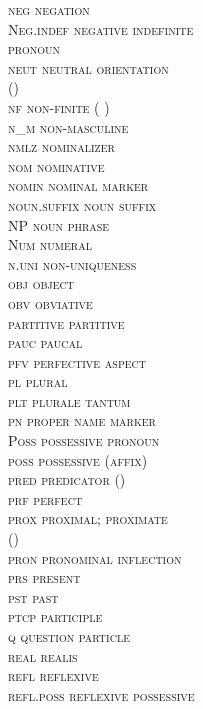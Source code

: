 \documentclass[output=collectionpaper]{langsci/langscibook}
\begin{document}
\begin{multicols}{2}
\begin{tabbing}
\scshape neg	\>	negation	\\
\normalfont Neg.indef	\>	negative indefinite\\ \> pronoun	\\
\scshape neut	\>	neutral orientation\\ \> () 	\\
\scshape nf	\>	non-finite ( )	\\
\scshape n\_m	\>	non-masculine	\\
\scshape nmlz	\>	nominalizer	\\
\scshape nom	\>	nominative	\\
\scshape nomin	\>	nominal marker	\\
\scshape noun.suffix	\>	noun suffix	\\
\scshape NP	\>	noun phrase	\\
\normalfont Num	\>	numeral	\\
\scshape n.uni	\>	non-uniqueness	\\
\scshape obj	\>	object	\\
\scshape obv	\>	obviative	\\
\scshape partitive	\>	partitive	\\
\scshape pauc	\>	paucal	\\
\scshape pfv	\>	perfective aspect	\\
\scshape pl	\>	plural	\\
\scshape plt	\>	plurale tantum	\\
\scshape pn	\>	proper name marker	\\
\normalfont Poss	\>	possessive pronoun	\\
\scshape poss	\>	possessive (affix)	\\
\scshape pred	\>	predicator ()	\\
\scshape prf	\>	perfect	\\
\scshape prox	\>	proximal; proximate\\ \> ()	\\
\scshape pron	\>	pronominal inflection	\\
\scshape prs	\>	present	\\
\scshape pst	\>	past	\\
\scshape ptcp	\>	participle	\\
\scshape q	\>	question particle	\\
\scshape real	\>	realis	\\
\scshape refl	\>	reflexive	\\
\scshape refl.poss	\>	reflexive possessive	\\

\end{tabbing}
\end{multicols}
\end{document}
